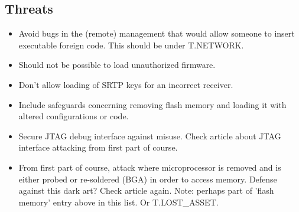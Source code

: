 \documentclass[10pt]{article}
\begin{document}
    \subsection{Threats}
      \begin{itemize}[label={}]
         {
          An attacker can physically access the camera. This can result in
          destruction of camera in pure vandalizing, removal of camera from
          premises opening up for other threats (T.X and T.Y), covering camera
          with other physical object or smearing something on camera
          housing/lens rendering recorded video useless.
        }
         {
          Since the camera is outfitted with a 4G subsystem, attacks relevant for
          such a system are relevant here.
          \\ Note: Go all the way as teacher's pets and specify that object
          security should be used?
        }
         {
          There is a risk that the persons managing and servicing the camera do
          not have the skills required, which can result in password being
          leaked, physical components of camera damaged, camera not mounted on
          wall correctly etc.
        }
        \item{
          Avoid bugs in the (remote) management that would allow someone to
          insert executable foreign code. This should be under T.NETWORK.
        }
        \item{
          Should not be possible to load unauthorized firmware.
        }
        \item{
          Don't allow loading of SRTP keys for an incorrect receiver.
        }
        \item{
          Include safeguards concerning removing flash memory and loading it
          with altered configurations or code.
        }
        \item{
          Secure JTAG debug interface against misuse. Check article about
          JTAG interface attacking from first part of course.
        }
        \item{
          From first part of course, attack where microprocessor is removed
          and is either probed or re-soldered (BGA) in order to access memory.
          Defense against this dark art? Check article again. Note: perhaps
          part of 'flash memory' entry above in this list. Or T.LOST\_ASSET.
        }
      \end{itemize}
\end{document}
